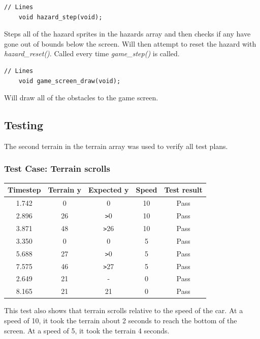 \documentclass{article}
\begin{document}
\begin{lstlisting}[style=CStyle]
	// Lines
	void hazard_step(void);
\end{lstlisting}
Steps all of the hazard sprites in the hazards array and then checks if any have gone out of bounds below the screen. Will then attempt to reset the hazard with \emph{hazard\_reset()}. Called every time \emph{game\_step()} is called.
\begin{lstlisting}[style=CStyle]
	// Lines 
	void game_screen_draw(void);
\end{lstlisting}
Will draw all of the obstacles to the game screen.
\newpage

\subsection*{Testing}
The second terrain in the terrain array was used to verify all test plans.

\subsubsection*{Test Case: Terrain scrolls}
\begin{center}
\begin{tabular}{ c c c c c }
Timestep	& Terrain y	& Expected y 	& Speed	& Test result		\\ \hline
1.742		& 0		& 0 			& 10		& Pass		\\
2.896		& 26		& \verb|>|0		& 10		& Pass		\\
3.871		& 48		& \verb|>|26	& 10		& Pass		\\
3.350		& 0		& 0			& 5		& Pass		\\
5.688		& 27		& \verb|>|0		& 5		& Pass		\\
7.575		& 46		& \verb|>|27	& 5		& Pass		\\
2.649		& 21		& - 			& 0		& Pass		\\
8.165		& 21		& 21			& 0		& Pass		\\ \hline
\end{tabular}
\end{center}
This test also shows that terrain scrolls relative to the speed of the car. At a speed of 10, it took the terrain about 2 seconds to reach the bottom of the screen. At a speed of 5, it took the terrain 4 seconds.
\clearpage

\end{document}
